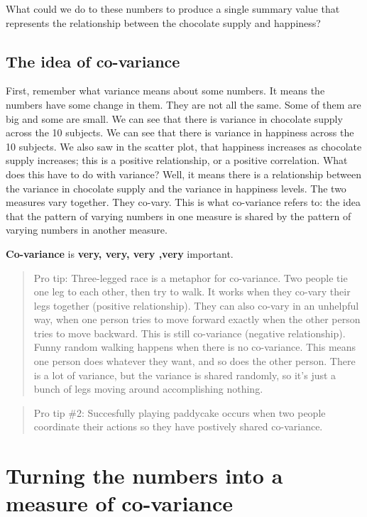 \documentclass[
]{book}
\begin{document}
What could we do to these numbers to produce a single summary value that represents the relationship between the chocolate supply and happiness?

\subsection{The idea of co-variance}\label{the-idea-of-co-variance}

First, remember what variance means about some numbers. It means the numbers have some change in them. They are not all the same. Some of them are big and some are small. We can see that there is variance in chocolate supply across the 10 subjects. We can see that there is variance in happiness across the 10 subjects. We also saw in the scatter plot, that happiness increases as chocolate supply increases; this is a positive relationship, or a positive correlation. What does this have to do with variance? Well, it means there is a relationship between the variance in chocolate supply and the variance in happiness levels. The two measures vary together. They co-vary. This is what co-variance refers to: the idea that the pattern of varying numbers in one measure is shared by the pattern of varying numbers in another measure.

\textbf{Co-variance} is \textbf{very, very, very ,very} important.

\begin{quote}
Pro tip: Three-legged race is a metaphor for co-variance. Two people tie one leg to each other, then try to walk. It works when they co-vary their legs together (positive relationship). They can also co-vary in an unhelpful way, when one person tries to move forward exactly when the other person tries to move backward. This is still co-variance (negative relationship). Funny random walking happens when there is no co-variance. This means one person does whatever they want, and so does the other person. There is a lot of variance, but the variance is shared randomly, so it's just a bunch of legs moving around accomplishing nothing.
\end{quote}

\begin{quote}
Pro tip \#2: Succesfully playing paddycake occurs when two people coordinate their actions so they have postively shared co-variance.
\end{quote}

\section{Turning the numbers into a measure of co-variance}\label{turning-the-numbers-into-a-measure-of-co-variance}
\end{document}
